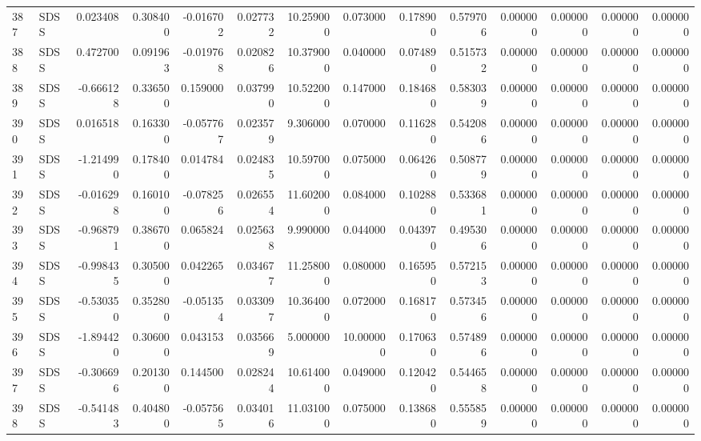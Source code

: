 \begin{tabular}{llrrrrrrrrrrrr}
387 &   SDSS &  0.023408 &      0.308400 & -0.016702 &    0.027732 &  10.259000 &      0.073000 &   0.178900 &  0.579706 &  0.000000 &   0.000000 &     0.000000 &     0.000000 \\
388 &   SDSS &  0.472700 &      0.091963 & -0.019768 &    0.020826 &  10.379000 &      0.040000 &   0.074890 &  0.515732 &  0.000000 &   0.000000 &     0.000000 &     0.000000 \\
389 &   SDSS & -0.666128 &      0.336500 &  0.159000 &    0.037990 &  10.522000 &      0.147000 &   0.184680 &  0.583039 &  0.000000 &   0.000000 &     0.000000 &     0.000000 \\
390 &   SDSS &  0.016518 &      0.163300 & -0.057767 &    0.023579 &   9.306000 &      0.070000 &   0.116280 &  0.542086 &  0.000000 &   0.000000 &     0.000000 &     0.000000 \\
391 &   SDSS & -1.214990 &      0.178400 &  0.014784 &    0.024835 &  10.597000 &      0.075000 &   0.064260 &  0.508779 &  0.000000 &   0.000000 &     0.000000 &     0.000000 \\
392 &   SDSS & -0.016298 &      0.160100 & -0.078256 &    0.026554 &  11.602000 &      0.084000 &   0.102880 &  0.533681 &  0.000000 &   0.000000 &     0.000000 &     0.000000 \\
393 &   SDSS & -0.968791 &      0.386700 &  0.065824 &    0.025638 &   9.990000 &      0.044000 &   0.043970 &  0.495306 &  0.000000 &   0.000000 &     0.000000 &     0.000000 \\
394 &   SDSS & -0.998435 &      0.305000 &  0.042265 &    0.034677 &  11.258000 &      0.080000 &   0.165950 &  0.572153 &  0.000000 &   0.000000 &     0.000000 &     0.000000 \\
395 &   SDSS & -0.530350 &      0.352800 & -0.051354 &    0.033097 &  10.364000 &      0.072000 &   0.168170 &  0.573456 &  0.000000 &   0.000000 &     0.000000 &     0.000000 \\
396 &   SDSS & -1.894420 &      0.306000 &  0.043153 &    0.035669 &   5.000000 &     10.000000 &   0.170630 &  0.574896 &  0.000000 &   0.000000 &     0.000000 &     0.000000 \\
397 &   SDSS & -0.306696 &      0.201300 &  0.144500 &    0.028244 &  10.614000 &      0.049000 &   0.120420 &  0.544658 &  0.000000 &   0.000000 &     0.000000 &     0.000000 \\
398 &   SDSS & -0.541483 &      0.404800 & -0.057565 &    0.034016 &  11.031000 &      0.075000 &   0.138680 &  0.555859 &  0.000000 &   0.000000 &     0.000000 &     0.000000 \\

\end{tabular}
